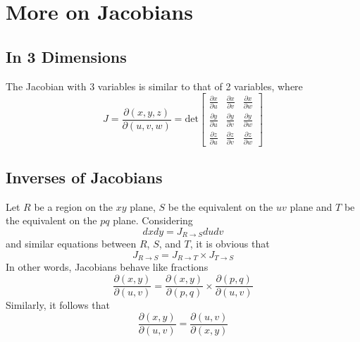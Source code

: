 \documentclass[12pt]{article}
\begin{document}
\section{More on Jacobians}

\subsection{In 3 Dimensions}

The Jacobian with 3 variables is similar to that of 2 variables, where
$$J = \frac{\partial(x,y,z)}{\partial(u,v,w)} = \text{det} \begin{bmatrix} \frac{\partial x}{\partial u} & \frac{\partial x}{\partial v} & \frac{\partial x}{\partial w} \\ \frac{\partial y}{\partial u} & \frac{\partial y}{\partial v} & \frac{\partial y}{\partial w} \\ \frac{\partial z}{\partial u} & \frac{\partial z}{\partial v} & \frac{\partial z}{\partial w} \end{bmatrix}$$

\subsection{Inverses of Jacobians}
Let $R$ be a region on the $xy$ plane, $S$ be the equivalent on the $uv$ plane and $T$ be the equivalent on the $pq$ plane. Considering
$$dxdy = J_{R \rightarrow S} dudv$$
and similar equations between $R$, $S$, and $T$, it is obvious that
$$J_{R \rightarrow S} = J_{R\rightarrow T} \times J_{T \rightarrow S}$$
In other words, Jacobians behave like fractions
$$\frac{\partial(x,y)}{\partial(u,v)} = \frac{\partial(x,y)}{\partial(p,q)} \times \frac{\partial(p,q)}{\partial(u,v)}$$
Similarly, it follows that
$$\frac{\partial(x,y)}{\partial(u,v)} = \frac{\partial(u,v)}{\partial(x,y)}$$
\end{document}
